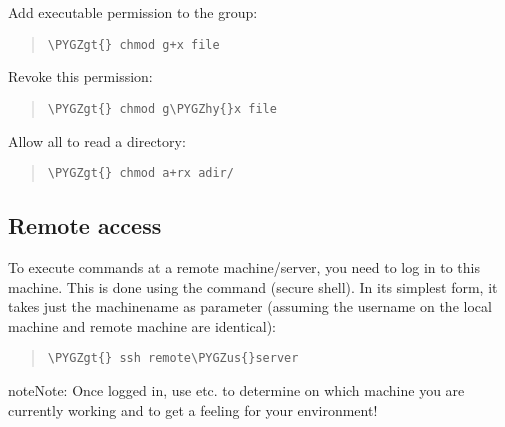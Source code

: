 \documentclass[a4paper,11pt,english]{sphinxmanual}
\def\PYGZus{\char`\_}
\def\PYGZgt{\char`\>}
\def\PYGZhy{\char`\-}
\begin{document}
Add executable permission to the group:
\begin{quote}

\begin{Verbatim}[frame=single, rulecolor=\color{lightgray}, fontfamily=courier, commandchars=\\\{\}]
\PYGZgt{} chmod g+x file
\end{Verbatim}
\end{quote}

Revoke this permission:
\begin{quote}

\begin{Verbatim}[frame=single, rulecolor=\color{lightgray}, fontfamily=courier, commandchars=\\\{\}]
\PYGZgt{} chmod g\PYGZhy{}x file
\end{Verbatim}
\end{quote}

Allow all to read a directory:
\begin{quote}

\begin{Verbatim}[frame=single, rulecolor=\color{lightgray}, fontfamily=courier, commandchars=\\\{\}]
\PYGZgt{} chmod a+rx adir/
\end{Verbatim}
\end{quote}


\subsection{Remote access}
\label{introduction:remote-access}
To execute commands at a remote machine/server, you need to log in to this machine. This is done
using the  command (secure shell). In its simplest form, it takes just the machinename as
parameter (assuming the username on the local machine and remote machine are identical):
\begin{quote}

\begin{Verbatim}[frame=single, rulecolor=\color{lightgray}, fontfamily=courier, commandchars=\\\{\}]
\PYGZgt{} ssh remote\PYGZus{}server
\end{Verbatim}
\end{quote}

\begin{notice}{note}{Note:}
Once logged in, use   etc. to
determine on which machine you are currently working and to get a feeling for your
environment!
\end{notice}
\end{document}
